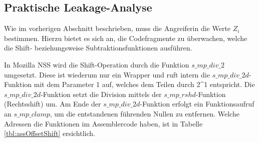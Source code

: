 \subsection{Praktische Leakage-Analyse}
\label{PracticalLeakageAnalysis}

Wie im vorherigen Abschnitt beschrieben, muss die Angreiferin die Werte $Z_i$ bestimmen.
Hierzu bietet es sich an, die Codefragmente zu überwachen, welche die Shift- beziehungsweise Subtraktionsfunktionen ausführen.

In Mozilla NSS wird die Shift-Operation durch die Funktion $s\_mp\_div\_2$ umgesetzt.
Diese ist wiederum nur ein Wrapper und ruft intern die $s\_mp\_div\_2d$-Funktion mit dem Parameter 1 auf, welches dem Teilen durch 2^1 entspricht.
Die $s\_mp\_div\_2d$-Funktion setzt die Division mittels der $s\_mp\_rshd$-Funktion (Rechtsshift) um. 
Am Ende der $s\_mp\_div\_2d$-Funktion erfolgt ein Funktionsaufruf an $s\_mp\_clamp$, um die entstandenen führenden Nullen zu entfernen.
Welche Adressen die Funktionen im Assemblercode haben, ist in Tabelle \ref{tbl:assOffsetShift} ersichtlich. 





